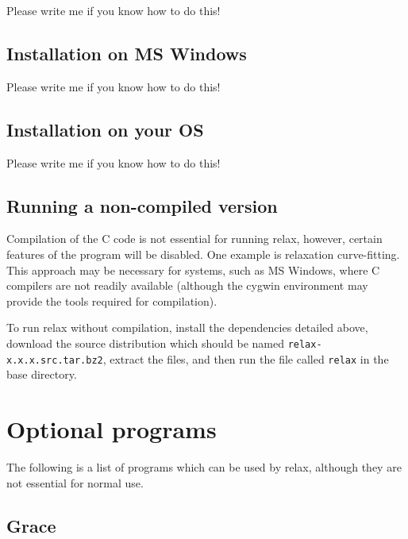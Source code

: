 Please write me if you know how to do this!



\subsection{Installation on MS Windows}

Please write me if you know how to do this!



\subsection{Installation on your OS}

Please write me if you know how to do this!



\subsection{Running a non-compiled version}

Compilation of the C code is not essential for running relax, however, certain features of the program will be disabled.  One example is relaxation curve-fitting.  This approach may be necessary for systems, such as MS Windows, where C compilers are not readily available (although the cygwin environment may provide the tools required for compilation).

To run relax without compilation, install the dependencies detailed above, download the source distribution which should be named \texttt{relax-x.x.x.src.tar.bz2}, extract the files, and then run the file called \texttt{relax} in the base directory.




\section{Optional programs}

The following is a list of programs which can be used by relax, although they are not essential for normal use.


\subsection{Grace}

